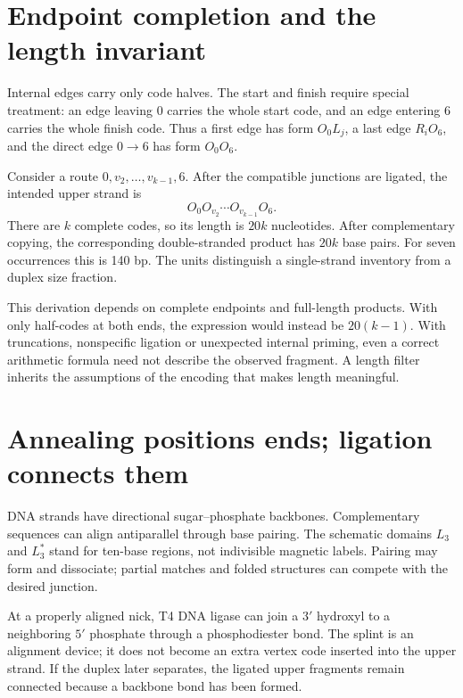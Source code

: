 \section{Endpoint completion and the length invariant}
Internal edges carry only code halves. The start and finish require special treatment: an edge leaving 0 carries the whole start code, and an edge entering 6 carries the whole finish code. Thus a first edge has form $O_0L_j$, a last edge $R_iO_6$, and the direct edge $0\to6$ has form $O_0O_6$.

Consider a route $0,v_2,\ldots,v_{k-1},6$. After the compatible junctions are ligated, the intended upper strand is
\[
O_0O_{v_2}\cdots O_{v_{k-1}}O_6.
\]
There are $k$ complete codes, so its length is $20k$ nucleotides. After complementary copying, the corresponding double-stranded product has $20k$ base pairs. For seven occurrences this is 140 bp. The units distinguish a single-strand inventory from a duplex size fraction.

This derivation depends on complete endpoints and full-length products. With only half-codes at both ends, the expression would instead be $20(k-1)$. With truncations, nonspecific ligation or unexpected internal priming, even a correct arithmetic formula need not describe the observed fragment. A length filter inherits the assumptions of the encoding that makes length meaningful.

\section{Annealing positions ends; ligation connects them}
DNA strands have directional sugar--phosphate backbones. Complementary sequences can align antiparallel through base pairing.\cite{Alberts2002} The schematic domains $L_3$ and $L_3^*$ stand for ten-base regions, not indivisible magnetic labels. Pairing may form and dissociate; partial matches and folded structures can compete with the desired junction.


At a properly aligned nick, T4 DNA ligase can join a $3'$ hydroxyl to a neighboring $5'$ phosphate through a phosphodiester bond.\cite{NEBT4Ligase} The splint is an alignment device; it does not become an extra vertex code inserted into the upper strand. If the duplex later separates, the ligated upper fragments remain connected because a backbone bond has been formed.

